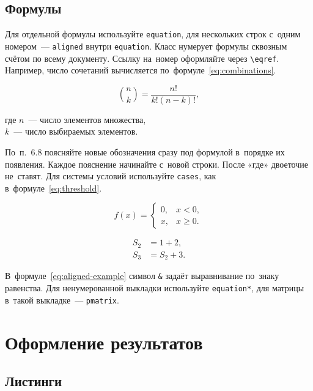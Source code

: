 \documentclass{bmstu}
\begin{document}
\section{Формулы}

Для отдельной формулы используйте \texttt{equation}, для нескольких строк с~одним номером~--- \texttt{aligned} внутри \texttt{equation}.
Класс нумерует формулы сквозным счётом по всему документу.
Ссылку на~номер оформляйте через \verb|\eqref|.
Например, число сочетаний вычисляется по~формуле~\eqref{eq:combinations}.

\begin{equation}\label{eq:combinations}
    \binom{n}{k} = \frac{n!}{k!(n-k)!},
\end{equation}

где $n$~--- число элементов множества,\\
$k$~--- число выбираемых элементов.

По~п.~6.8 поясняйте новые обозначения сразу под формулой в~порядке их появления.
Каждое пояснение начинайте с~новой строки.
После «где» двоеточие не~ставят.
Для системы условий используйте \texttt{cases}, как в~формуле~\eqref{eq:threshold}.

\begin{equation}\label{eq:threshold}
    f(x)=
    \begin{cases}
        0, & x < 0,\\
        x, & x \geq 0.
    \end{cases}
\end{equation}

\begin{equation}\label{eq:aligned-example}
    \begin{aligned}
        S_2 &= 1 + 2,\\
        S_3 &= S_2 + 3.
    \end{aligned}
\end{equation}

В~формуле~\eqref{eq:aligned-example} символ \verb|&| задаёт выравнивание по~знаку равенства.
Для ненумерованной выкладки используйте \texttt{equation*}, для матрицы в~такой выкладке~--- \texttt{pmatrix}.

\chapter{Оформление результатов}

\section{Листинги}
\end{document}
